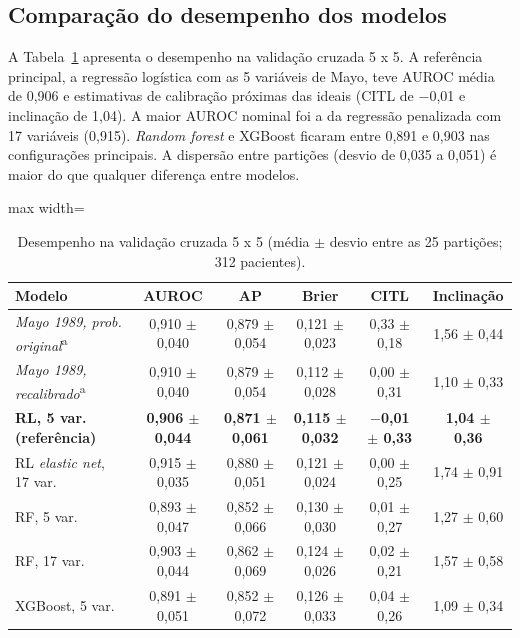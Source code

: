 \subsection{Comparação do desempenho dos modelos}
A Tabela~\ref{tab:resultados} apresenta o desempenho na validação cruzada 5 x 5. A referência principal, a regressão logística com as 5 variáveis de Mayo, teve AUROC média de 0,906 e estimativas de calibração próximas das ideais (CITL de $-$0,01 e inclinação de 1,04). A maior AUROC nominal foi a da regressão penalizada com 17 variáveis (0,915). \textit{Random forest} e XGBoost ficaram entre 0,891 e 0,903 nas configurações principais. A dispersão entre partições (desvio de 0,035 a 0,051) é maior do que qualquer diferença entre modelos.

\begin{table}[htbp]
\centering
\caption{Desempenho na validação cruzada 5 x 5 (média $\pm$ desvio entre as 25 partições; 312 pacientes).}
\label{tab:resultados}
\footnotesize
\renewcommand{\arraystretch}{1.16}
\setlength{\tabcolsep}{4pt}
\begin{adjustbox}{max width=\linewidth}
\begin{tabular}{@{}lccccc@{}}
\toprule
\textbf{Modelo} & \textbf{AUROC} & \textbf{AP} & \textbf{Brier} & \textbf{CITL} & \textbf{Inclinação} \\
\midrule
\textit{Mayo 1989, prob. original}\textsuperscript{a} & 0,910 $\pm$ 0,040 & 0,879 $\pm$ 0,054 & 0,121 $\pm$ 0,023 & 0,33 $\pm$ 0,18 & 1,56 $\pm$ 0,44 \\
\textit{Mayo 1989, recalibrado}\textsuperscript{a} & 0,910 $\pm$ 0,040 & 0,879 $\pm$ 0,054 & 0,112 $\pm$ 0,028 & 0,00 $\pm$ 0,31 & 1,10 $\pm$ 0,33 \\
\textbf{RL, 5 var. (referência)} & \textbf{0,906 $\pm$ 0,044} & \textbf{0,871 $\pm$ 0,061} & \textbf{0,115 $\pm$ 0,032} & \textbf{$-$0,01 $\pm$ 0,33} & \textbf{1,04 $\pm$ 0,36} \\
RL \textit{elastic net}, 17 var. & 0,915 $\pm$ 0,035 & 0,880 $\pm$ 0,051 & 0,121 $\pm$ 0,024 & 0,00 $\pm$ 0,25 & 1,74 $\pm$ 0,91 \\
RF, 5 var. & 0,893 $\pm$ 0,047 & 0,852 $\pm$ 0,066 & 0,130 $\pm$ 0,030 & 0,01 $\pm$ 0,27 & 1,27 $\pm$ 0,60 \\
RF, 17 var. & 0,903 $\pm$ 0,044 & 0,862 $\pm$ 0,069 & 0,124 $\pm$ 0,026 & 0,02 $\pm$ 0,21 & 1,57 $\pm$ 0,58 \\
XGBoost, 5 var. & 0,891 $\pm$ 0,051 & 0,852 $\pm$ 0,072 & 0,126 $\pm$ 0,033 & 0,04 $\pm$ 0,26 & 1,09 $\pm$ 0,34 \\

\end{tabular}
\end{adjustbox}
\end{table}
